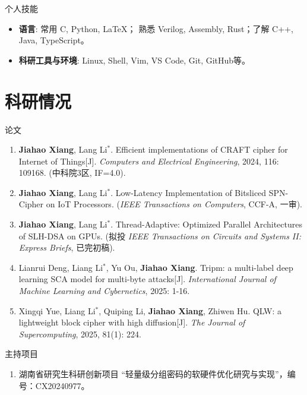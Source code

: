 \documentclass[12pt,a4paper]{article}
\begin{document}
个人技能
\begin{itemize}[leftmargin=2em]
  \item \textbf{语言}: 常用 C, Python, \LaTeX； 熟悉 Verilog, Assembly, Rust；了解 C++, Java, TypeScript。
  \item \textbf{科研工具与环境}: Linux, Shell, Vim, VS Code, Git, GitHub等。
\end{itemize}

\section*{科研情况}
论文
\begin{enumerate}[leftmargin=2em]
  \item \textbf{Jiahao Xiang}, Lang Li$^*$. Efficient implementations of CRAFT cipher for Internet of Things[J]. \textit{Computers and Electrical Engineering}, 2024, 116: 109168. (中科院3区, IF=4.0).
  \item \textbf{Jiahao Xiang}, Lang Li$^*$. Low-Latency Implementation of Bitsliced SPN-Cipher on IoT Processors. (\textit{IEEE Transactions on Computers}, CCF-A, 一审).
  \item \textbf{Jiahao Xiang}, Lang Li$^*$. Thread-Adaptive: Optimized Parallel Architectures of SLH-DSA on GPUs. (拟投 \textit{IEEE Transactions on Circuits and Systems II: Express Briefs}, 已完初稿).
  \item Lianrui Deng, Liang Li$^*$, Yu Ou, \textbf{Jiahao Xiang}. Tripm: a multi-label deep learning SCA model for multi-byte attacks[J]. \textit{International Journal of Machine Learning and Cybernetics}, 2025: 1-16.
  \item Xingqi Yue, Liang Li$^*$, Quiping Li, \textbf{Jiahao Xiang}, Zhiwen Hu. QLW: a lightweight block cipher with high diffusion[J]. \textit{The Journal of Supercomputing}, 2025, 81(1): 224.
\end{enumerate}

主持项目

\begin{enumerate}[leftmargin=2em]
  \item 湖南省研究生科研创新项目 ``轻量级分组密码的软硬件优化研究与实现''，编号：CX20240977。
\end{enumerate}
\end{document}

